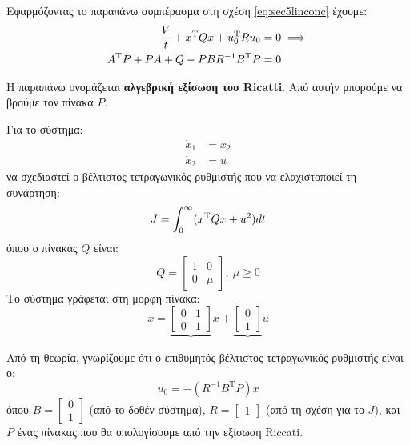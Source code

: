 \documentclass[11pt,a4paper,notitlepage,fleqn]{article}
\begin{document}
Εφαρμόζοντας το παραπάνω συμπέρασμα στη σχέση \eqref{eq:sec5linconc} έχουμε:
\begin{align*}
	\frac{V}{t} + x^{\mathrm T}Qx + u_0^{\mathrm T} R u_0 &= 0 \implies \\
	A^{\mathrm T}P + PA + Q - PBR^{-1}B^{\mathrm T}P &= 0
\end{align*}

Η παραπάνω ονομάζεται \textbf{αλγεβρική εξίσωση του Ricatti}. Από αυτήν
μπορούμε να βρούμε τον πίνακα \( P \).

\begin{exercise}
	Για το σύστημα:
	\begin{align*}
		\dot x_1 &= x_2 \\
		\dot x_2 &= u
	\end{align*}
	να σχεδιαστεί ο βέλτιστος τετραγωνικός ρυθμιστής που να ελαχιστοποιεί
	τη συνάρτηση:
	\[
	J = \int_{0 }^{\infty} (x^{\mathrm T} Q x +u^2)d t
	\]
	όπου ο πίνακας \( Q \) είναι:
	\[
	Q = \left[\begin{matrix}
	1 & 0 \\ 0 & \mu
	\end{matrix}\right], \ \mu \geq 0
	\]
	\tcblower
	Το σύστημα γράφεται στη μορφή πίνακα:
	\[
	\dot x = \underbrace{\left[\begin{matrix}
		0 & 1 \\ 0 & 1
		\end{matrix}\right]}x + \underbrace{\left[\begin{matrix}
		0 \\ 1
		\end{matrix}\right]}u
	\]
	
	Από τη θεωρία, γνωρίζουμε ότι ο επιθυμητός βέλτιστος τετραγωνικός
	ρυθμιστής είναι ο:
	\[
	u_0 = -(R^{-1}B^{\mathrm T}P)x
	\]
	όπου \( B = \left[\begin{matrix}
	0 \\ 1
	\end{matrix}\right] \) (από το δοθέν σύστημα), \( R = \left[\begin{matrix}
	1
	\end{matrix}\right] \) (από τη σχέση για το \( J \)), και \( P \)
	ένας πίνακας που θα υπολογίσουμε από την εξίσωση Riccati.
	

\end{exercise}
\end{document}
